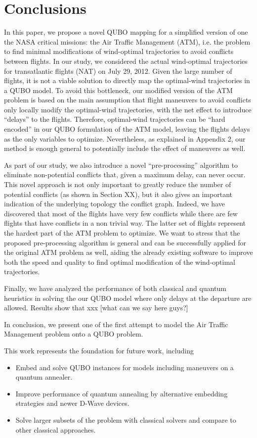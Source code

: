 \section{Conclusions}
In this paper, we propose a novel QUBO mapping for a simplified version of one
the NASA critical missions: the Air Traffic Management (ATM), i.e. the problem
to find minimal modifications of wind-optimal trajectories to avoid conflicts
between flights. In our study, we considered the actual wind-optimal
trajectories for transatlantic flights (NAT) on July 29, 2012. Given the large
number of flights, it is not a viable solution to directly map the optimal-wind
trajectories in a QUBO model. To avoid this bottleneck, our modified version of
the ATM problem is based on the main assumption that flight maneuvers to avoid
conflicts only locally modify the optimal-wind trajectories, with the net effect
to introduce ``delays'' to the flights. Therefore, optimal-wind trajectories can
be ``hard encoded'' in our QUBO formulation of the ATM model, leaving the
flights delays as the only variables to optimize. Nevertheless, as explained in
Appendix 2, our method is enough general to potentially include the effect of
maneuvers as well. 

As part of our study, we also introduce a novel ``pre-processing'' algorithm to
eliminate non-potential conflicts that, given a maximum delay, can never occur.
This novel approach is not only important to greatly reduce the number of
potential conflicts (as shown in Section XX), but it also gives an important
indication of the underlying topology the conflict graph. Indeed, we have
discovered that most of the flights have very few conflicts while there are
few flights that have conflicts in a non trivial way. The latter set of flights
represent the hardest part of the ATM problem to optimize. We want to stress
that the proposed pre-processing algorithm is general and can be successfully
applied for the original ATM problem as well, aiding the already existing
software to improve both the speed and quality to find optimal modification of
the wind-optimal trajectories. 

Finally, we have analyzed the performance of both classical and quantum
heuristics in solving the our QUBO model where only delays at the departure are
allowed. Results show that xxx [what can we say here guys?]

In conclusion, we present one of the first attempt to model the Air Traffic
Management problem onto a QUBO problem. 


{
\color{red} 
This work represents the foundation for future work, including
\begin{itemize}
    \item Embed and solve QUBO instances for models including maneuvers on a quantum annealer.
    \item Improve performance of quantum annealing by alternative embedding strategies and newer D-Wave devices.
    \item Solve larger subsets of the problem with classical solvers and compare to other classical approaches.
\end{itemize}
}
